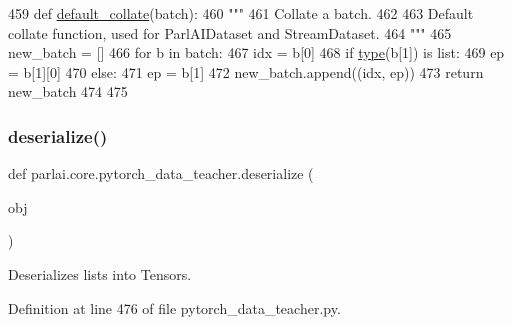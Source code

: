\begin{DoxyCode}
459 \textcolor{keyword}{def }\hyperlink{namespaceparlai_1_1core_1_1pytorch__data__teacher_a7236aa20497f2a598df9b85909901184}{default\_collate}(batch):
460     \textcolor{stringliteral}{"""}
461 \textcolor{stringliteral}{    Collate a batch.}
462 \textcolor{stringliteral}{}
463 \textcolor{stringliteral}{    Default collate function, used for ParlAIDataset and StreamDataset.}
464 \textcolor{stringliteral}{    """}
465     new\_batch = []
466     \textcolor{keywordflow}{for} b \textcolor{keywordflow}{in} batch:
467         idx = b[0]
468         \textcolor{keywordflow}{if} \hyperlink{namespaceparlai_1_1agents_1_1tfidf__retriever_1_1build__tfidf_ad5dfae268e23f506da084a9efb72f619}{type}(b[1]) \textcolor{keywordflow}{is} list:
469             ep = b[1][0]
470         \textcolor{keywordflow}{else}:
471             ep = b[1]
472         new\_batch.append((idx, ep))
473     \textcolor{keywordflow}{return} new\_batch
474 
475 
\end{DoxyCode}
\mbox{\label{namespaceparlai_1_1core_1_1pytorch__data__teacher_a0c6f08553514c14d037da194f9d112ae}} 
\subsubsection{\texorpdfstring{deserialize()}{deserialize()}}
{\footnotesize\ttfamily def parlai.\+core.\+pytorch\+\_\+data\+\_\+teacher.\+deserialize (\begin{DoxyParamCaption}\item[{}]{obj }\end{DoxyParamCaption})}

\begin{DoxyVerb}Deserializes lists into Tensors.
\end{DoxyVerb}
 

Definition at line 476 of file pytorch\+\_\+data\+\_\+teacher.\+py.


